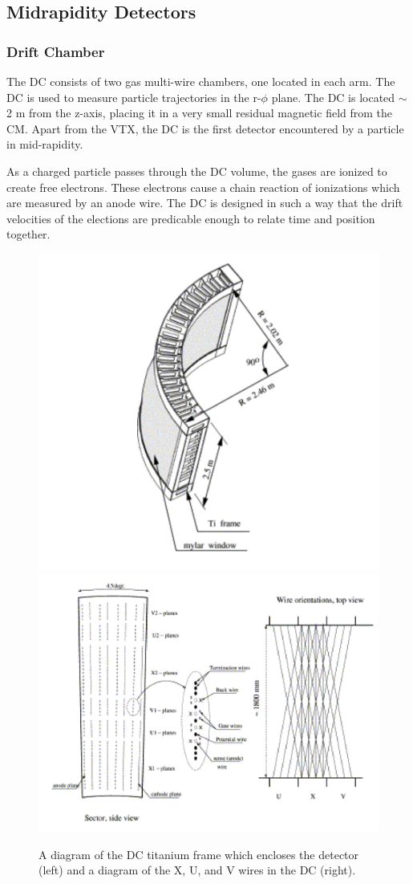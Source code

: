 \subsection{Midrapidity Detectors}
\subsubsection{Drift Chamber}
The DC consists of two gas multi-wire chambers, one located in each arm. The DC is used to measure particle trajectories in the r-$\phi$ plane.
The DC is located $\sim$2 m from the z-axis, placing it in a very small residual magnetic field from the CM. Apart from the VTX, the DC is the first detector encountered by a particle in mid-rapidity. 

As a charged particle passes through the DC volume, the gases are ionized to create free electrons. These electrons cause a chain reaction of ionizations which are measured by an anode wire. The DC is designed in such a way that the drift velocities of the elections are predicable enough to relate time and position together. 

\begin{figure}[!ht]
\begin{center}
\includegraphics[width=0.45\linewidth]{figs/dc_diagram.png}
\includegraphics[width=0.45\linewidth]{figs/dc_wire_diagram.png}
\caption{A diagram of the DC titanium frame which encloses the detector (left) and a diagram of the X, U, and V wires in the DC (right).}
\label{fig:dc_diagram}
\end{center}
\end{figure}

